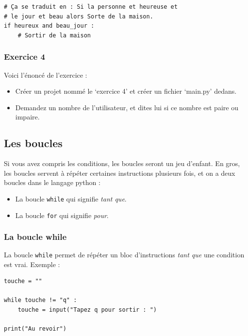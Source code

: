 \documentclass[12pt]{article}
\newcommand{\code}[1]{\colorbox{light-gray}{\texttt{#1}}}
\def\abIconQuestion{\symbol{"F059}}
\newcommand{\questionbox}[1]{%
  \awesomebox{\abIconQuestion}{\aweboxrulewidth}{abwarning}{#1}}
\begin{document}
            \begin{lstlisting}[style=code]
# Ça se traduit en : Si la personne et heureuse et 
# le jour et beau alors Sorte de la maison.
if heureux and beau_jour :
    # Sortir de la maison
            \end{lstlisting}

        \subsubsection{Exercice 4}
            Voici l'énoncé de l'exercice :
            \begin{itemize}
                \item Créer un projet nommé le `exercice 4' et créer un fichier `main.py' dedans.
                \item Demandez un nombre de l'utilisateur, et dites lui si ce nombre est paire ou impaire.
            \end{itemize}

\clearpage

    \subsection{Les boucles}
        Si vous avez compris les conditions, les boucles seront un jeu d'enfant. En gros, les boucles servent à répéter
        certaines instructions plusieurs fois, et on a deux boucles dans le langage python :
        \begin{itemize}
            \item La boucle \code{while} qui signifie \emph{tant que}.
            \item La boucle \code{for} qui signifie \emph{pour}.
        \end{itemize}


        \subsubsection{La boucle while}

            La boucle \code{while} permet de répéter un bloc d'instructions \emph{tant que} une condition est vrai.
            Exemple :
            \begin{lstlisting}[style=code]
touche = ""

while touche != "q" :
    touche = input("Tapez q pour sortir : ")

print("Au revoir")
            \end{lstlisting}
\end{document}
